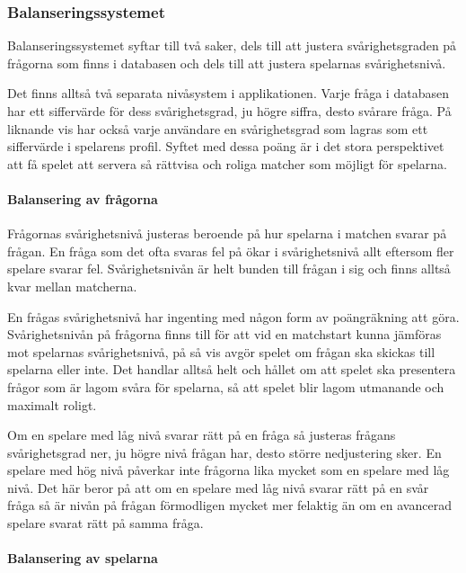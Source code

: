 \documentclass[a4paper, 11pt]{article}
\begin{document}
\subsubsection{Balanseringssystemet} \label{balanseringssystemet}
Balanseringssystemet syftar till två saker, dels till att justera svårighetsgraden på frågorna som finns i databasen och dels till att justera spelarnas svårighetsnivå. 

Det finns alltså två separata nivåsystem i applikationen. Varje fråga i databasen har ett siffervärde för dess svårighetsgrad, ju högre siffra, desto svårare fråga. På liknande vis har också varje användare en svårighetsgrad som lagras som ett siffervärde i spelarens profil. Syftet med dessa poäng är i det stora perspektivet att få spelet att servera så rättvisa och roliga matcher som möjligt för spelarna. 

\paragraph{Balansering av frågorna}

Frågornas svårighetsnivå justeras beroende på hur spelarna i matchen svarar på frågan. En fråga som det ofta svaras fel på ökar i svårighetsnivå allt eftersom fler spelare svarar fel. Svårighetsnivån är helt bunden till frågan i sig och finns alltså kvar mellan matcherna.

En frågas svårighetsnivå har ingenting med någon form av poängräkning att göra. Svårighetsnivån på frågorna finns till för att vid en matchstart kunna jämföras mot spelarnas svårighetsnivå, på så vis avgör spelet om frågan ska skickas till spelarna eller inte. Det handlar alltså helt och hållet om att spelet ska presentera frågor som är lagom svåra för spelarna, så att spelet blir lagom utmanande och maximalt roligt.

Om en spelare med låg nivå svarar rätt på en fråga så justeras frågans svårighetsgrad ner, ju högre nivå frågan har, desto större nedjustering sker. En spelare med hög nivå påverkar inte frågorna lika mycket som en spelare med låg nivå. Det här beror på att om en spelare med låg nivå svarar rätt på en svår fråga så är nivån på frågan förmodligen mycket mer felaktig än om en avancerad spelare svarat rätt på samma fråga. 

\paragraph{Balansering av spelarna}
\end{document}
